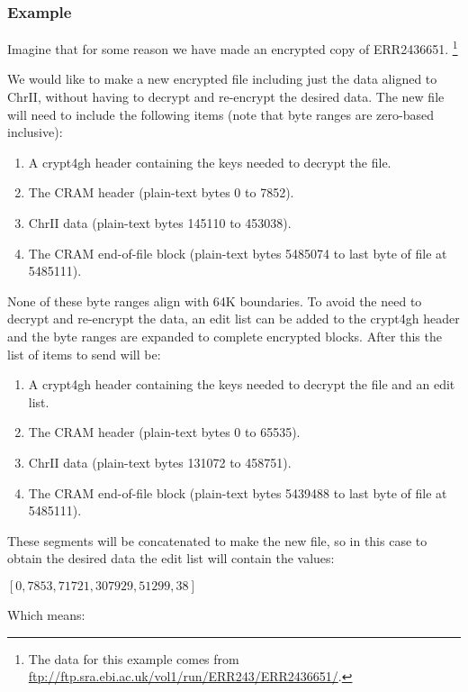 \documentclass[10pt]{article}
\begin{document}
\subsubsection{Example}

Imagine that for some reason we have made an encrypted copy of ERR2436651.
\footnote{The data for this example comes from \url{ftp://ftp.sra.ebi.ac.uk/vol1/run/ERR243/ERR2436651/}.}

We would like to make a new encrypted file including just the data aligned to ChrII,
without having to decrypt and re-encrypt the desired data.
The new file will need to include the following items (note that byte ranges are zero-based inclusive):

\begin{enumerate}
\item A crypt4gh header containing the keys needed to decrypt the file.
\item The CRAM header (plain-text bytes 0 to 7852).
\item ChrII data (plain-text bytes 145110 to 453038).
\item The CRAM end-of-file block (plain-text bytes 5485074 to last byte of file at 5485111).
\end{enumerate}

None of these byte ranges align with 64K boundaries.
To avoid the need to decrypt and re-encrypt the data,
an edit list can be added to the crypt4gh header and the byte ranges are expanded to complete encrypted blocks.
After this the list of items to send will be:

\begin{enumerate}
\item A crypt4gh header containing the keys needed to decrypt the file and an edit list.
\item The CRAM header (plain-text bytes 0 to 65535).
\item ChrII data (plain-text bytes 131072 to 458751).
\item The CRAM end-of-file block (plain-text bytes 5439488 to last byte of file at 5485111).
\end{enumerate}

These segments will be concatenated to make the new file,
so in this case to obtain the desired data the edit list will contain the values:
\begin{center}
$[0, 7853, 71721, 307929, 51299, 38]$
\end{center}

Which means:
\end{document}
